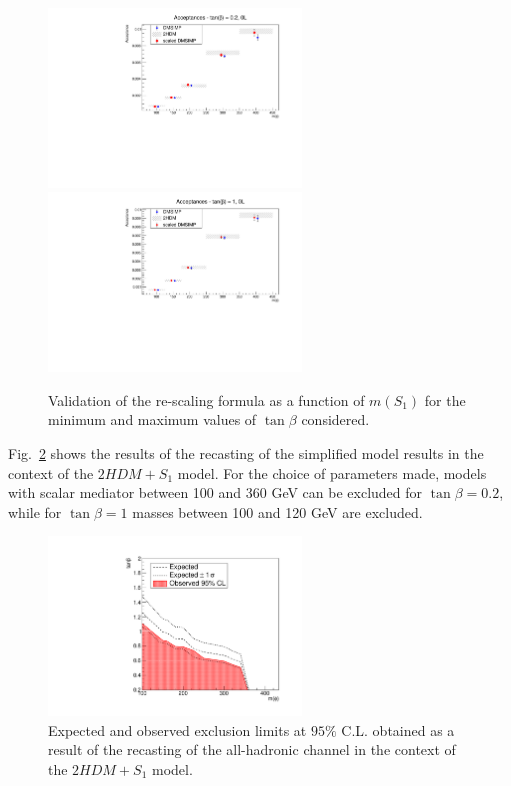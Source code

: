 \begin{figure}
  \centering
  \includegraphics[width=0.6\textwidth]{texinputs/04_grid/figures/DMHF/THDMs/rescalingS1tgb02.pdf}
   \includegraphics[width=0.6\textwidth]{texinputs/04_grid/figures/DMHF/THDMs/rescalingS1tgb10.pdf}
\caption{Validation of the re-scaling formula as a function of $m(S_1)$ for the minimum and maximum values of $\tan{\beta}$ considered.}
 \label{fig:rescS1}
\end{figure}

Fig.~\ref{fig:resultsS1} shows the results of the recasting of the simplified model results in the context of the 
$2HDM+S_1$ model. For the choice of parameters made, models with scalar mediator between 100 and 360 GeV 
can be excluded for $\tan\beta = 0.2$, while for $\tan\beta = 1$ masses between 100 and 120 GeV are excluded.

\begin{figure}
  \centering
  \includegraphics[width=0.6\textwidth]{texinputs/04_grid/figures/DMHF/THDMs/resultsS1.pdf}
\caption{Expected and observed exclusion limits at $95\%$ C.L. obtained as a result of the recasting of the all-hadronic channel
in the context of the $2HDM+S_1$ model.}
  \label{fig:resultsS1}
\end{figure}



%



